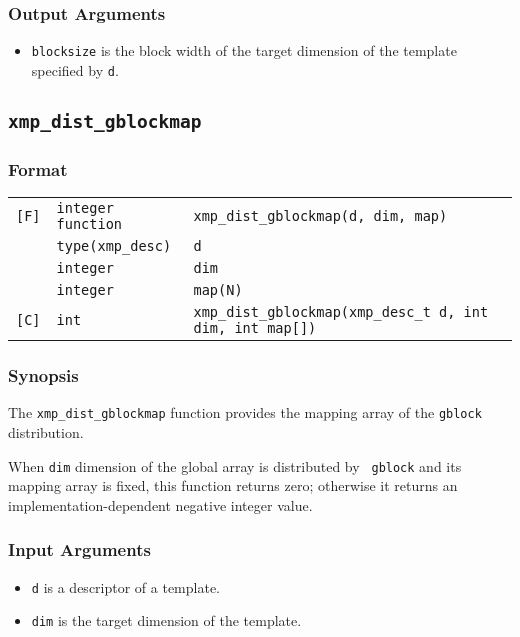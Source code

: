 \subsubsection*{Output Arguments}
\begin{itemize}
 \item {\tt blocksize} is the block width of the target dimension of
       the template specified by {\tt d}.
\end{itemize}


\subsection{\tt xmp\_dist\_gblockmap}

\subsubsection*{Format}

\begin{tabular}{lll}

\verb![F]!& {\tt integer function}& {\tt xmp\_dist\_gblockmap(d, dim, map)}\\
          & {\tt type(xmp\_desc)} & {\tt d}\\
          & {\tt integer} & {\tt dim}\\
          & {\tt integer} & {\tt map(N)}\\

\verb![C]!&  {\tt int}& {\tt xmp\_dist\_gblockmap(xmp\_desc\_t d, int dim, int map[])}\\

\end{tabular}

\subsubsection*{Synopsis}

The {\tt xmp\_dist\_gblockmap} function provides the mapping array of the
{\tt gblock} distribution.

When {\tt dim} dimension of the global array is distributed by {\tt
gblock} and its mapping array is fixed, this function returns zero;
otherwise it returns an implementation-dependent negative integer value.

\subsubsection*{Input Arguments}
\begin{itemize}
 \item {\tt d} is a descriptor of a template.
 \item {\tt dim} is the target dimension of the template.
\end{itemize}

